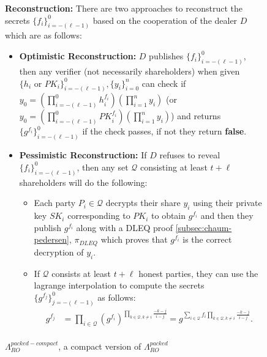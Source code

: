 \begin{figure}[ht]
{\begin{tcolorbox}[title=\textbf{$\Lambda_{RO}^{packed-compact}$}, width=1.2\textwidth, colframe=blue!75!black, colback=blue!10, sharp corners]
        \vspace{0.5em}
        \textbf{Reconstruction:}
            There are two approaches to reconstruct the secrets 
            $\{f_i\}_{i=-(\ell-1)}^0$ based on the cooperation of the dealer $D$ which are as follows:
            \begin{itemize}
                \item \textbf{Optimistic Reconstruction:} $D$ publishes $\{f_i\}_{i=-(\ell-1)}^0$, then any verifier (not necessarily shareholders) 
                when given $\{h_i\text{ or }PK_i\}_{i=-(\ell-1)}^0,\{y_i\}_{i=0}^n$ can check if $y_0=(\prod_{i=-(\ell-1)}^0h_i^{f_i})(\prod_{i=1}^{n}y_i)$ (or $y_0=(\prod_{i=-(\ell-1)}^0PK_i^{f_i})(\prod_{i=1}^{n}y_i)$) 
                and returns $\{g^{f_i}\}_{i=-(\ell-1)}^0$ if the check passes, if not they return \textbf{false}.
                \item \textbf{Pessimistic Reconstruction:} If $D$ refuses to reveal $\{f_i\}_{i=-(\ell-1)}^0$, then any set 
                $\mathcal{Q}$ consisting at least $t+\ell$ shareholders will do the following:
                \begin{itemize}
                    \item Each party $P_i\in\mathcal{Q}$ decrypts their share $y_i$ using their private key $SK_i$ 
                      corresponding to $PK_i$ to obtain $g^{f_i}$ and then they publish $g^{f_i}$ 
                      along with a DLEQ proof \ref{subsec:chaum-pedersen}, $\pi_{DLEQ}$ which proves that 
                      $g^{f_i}$ is the correct decryption of $y_i$.
                    \item If $\mathcal{Q}$ consists at least $t+\ell$ honest parties, they can use the 
                    lagrange interpolation to compute the secrets $\{g^{f_j}\}_{j=-(\ell-1)}^0$ as follows:
                    \begin{align*}
                        g^{f_j} &= \prod_{i\in\mathcal{Q}}(g^{f_i})^{\prod_{k\in\mathcal{Q},k\neq i}\frac{-k-j}{i-j}}= g^{\sum_{i\in\mathcal{Q}}f_i\prod_{k\in\mathcal{Q},k\neq i}\frac{-k-j}{i-j}}.\\
                    \end{align*}
                \end{itemize}
            \end{itemize}
    \end{tcolorbox}
    }
    \caption[PPPVSS]{$\Lambda_{RO}^{packed-compact}$, a compact version of $\Lambda_{RO}^{packed}$}
    \label{fig:compact-packed-shamir-PPPVSS-ro}
\end{figure}
